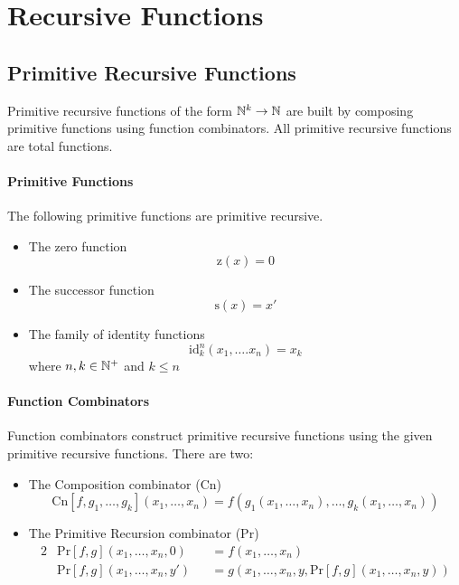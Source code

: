 \section{Recursive Functions}

\subsection{Primitive Recursive Functions}

Primitive recursive functions of the form $\mathbb{N}^k \rightarrow \mathbb{N}$ are built by
composing primitive functions using function combinators. All primitive 
recursive functions are total functions.

\paragraph{Primitive Functions}

The following primitive functions are primitive recursive.

\begin{itemize}
    \item The zero function
          $$\mathrm{z}(x) = 0$$
    \item The successor function
          $$\mathrm{s}(x) = x'$$
    \item The family of identity functions
          $$\mathrm{id}^n_k(x_1, \ldots. x_n) = x_k$$
          where $n, k \in \mathbb{N}^+$ and $k \leq n$
\end{itemize}

\paragraph{Function Combinators}

Function combinators construct primitive recursive functions using the given 
primitive recursive functions. There are two:

\begin{itemize}
    \item The Composition combinator ($\mathrm{Cn}$)
          $$\mathrm{Cn}[f, g_1, \ldots, g_k](x_1, \ldots, x_n) = 
          f(g_1(x_1, \dots, x_n), \ldots, g_k(x_1, \ldots, x_n))$$
    \item The Primitive Recursion combinator ($\mathrm{Pr}$)
          \begin{alignat*}{2}
            &\mathrm{Pr}[f, g](x_1, \ldots, x_n, 0) &&= f(x_1, \ldots, x_n) \\
            &\mathrm{Pr}[f, g](x_1, \ldots, x_n, y') &&= g(x_1, \ldots, x_n, y, 
            \mathrm{Pr}[f, g](x_1, \ldots, x_n, y))
          \end{alignat*}

\end{itemize}

